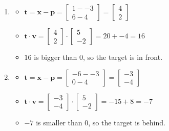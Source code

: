 \documentclass[11pt]{article}
\begin{document}
\begin{enumerate}[a.]
\begin{enumerate}[1.)]
	\item %
	\begin{itemize}
		\item $\textbf{t}=\textbf{x}-\textbf{p}=\begin{bmatrix}
1 - -3 \\ 6 - 4		
\end{bmatrix}=\begin{bmatrix}
4 \\ 2	
\end{bmatrix}$
		\item $\textbf{t} \cdot \textbf{v} =
\begin{bmatrix}
4 \\ 2
\end{bmatrix}\cdot
\begin{bmatrix}
5 \\ -2	
\end{bmatrix}=
20+-4=16$
		\item $16$ is bigger than $0$, so the target is in front.
	\end{itemize}
	
	\item %
	\begin{itemize}
		\item $\textbf{t}=\textbf{x}-\textbf{p}=\begin{bmatrix}
-6 - -3 \\ 0 - 4		
\end{bmatrix}=\begin{bmatrix}
-3 \\ -4 	
\end{bmatrix}$
		\item $\textbf{t} \cdot \textbf{v} =
\begin{bmatrix}
-3 \\ -4	
\end{bmatrix}\cdot
\begin{bmatrix}
5 \\ -2	
\end{bmatrix}=-15+8=-7$
		\item $-7$ is smaller than $0$, so the target is behind.
	\end{itemize}
	

\end{enumerate}
\end{enumerate}
\end{document}
